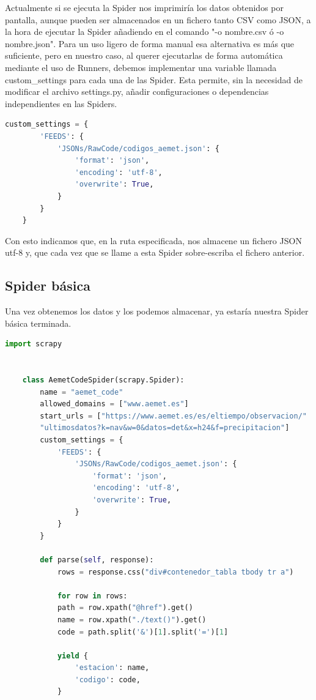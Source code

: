 Actualmente si se ejecuta la Spider nos imprimiría los datos obtenidos por pantalla, aunque pueden ser almacenados en un fichero tanto CSV como JSON, a la hora de ejecutar la Spider añadiendo en el comando "-o nombre.csv ó -o nombre.json".\newline
\newline
Para un uso ligero de forma manual esa alternativa es más que suficiente, pero en nuestro caso, al querer ejecutarlas de forma automática mediante el uso de Runners, debemos implementar una variable llamada custom\_settings para cada una de las Spider. Esta permite, sin la necesidad de modificar el archivo settings.py, añadir configuraciones o dependencias independientes en las Spiders.

\begin{lstlisting}[language=Python, caption={Confugurar guardado en JSON}]
	custom_settings = {
		'FEEDS': {
			'JSONs/RawCode/codigos_aemet.json': {
				'format': 'json',
				'encoding': 'utf-8',
				'overwrite': True,
			}
		}
	}
\end{lstlisting}

Con esto indicamos que, en la ruta especificada, nos almacene un fichero JSON utf-8 y, que cada vez que se llame a esta Spider sobre-escriba el fichero anterior.

\subsection{Spider básica}
Una vez obtenemos los datos y los podemos almacenar, ya estaría nuestra Spider básica terminada.

\begin{lstlisting}[language=Python, caption={Spider de ejemplo}]
	import scrapy
	
	
	class AemetCodeSpider(scrapy.Spider):
		name = "aemet_code"
		allowed_domains = ["www.aemet.es"]
		start_urls = ["https://www.aemet.es/es/eltiempo/observacion/"
		"ultimosdatos?k=nav&w=0&datos=det&x=h24&f=precipitacion"]
		custom_settings = {
			'FEEDS': {
				'JSONs/RawCode/codigos_aemet.json': {
					'format': 'json',
					'encoding': 'utf-8',
					'overwrite': True,
				}
			}
		}
	
		def parse(self, response):
			rows = response.css("div#contenedor_tabla tbody tr a")
			
			for row in rows:
			path = row.xpath("@href").get()
			name = row.xpath("./text()").get()
			code = path.split('&')[1].split('=')[1]
			
			yield {
				'estacion': name,
				'codigo': code,
			}
\end{lstlisting}

